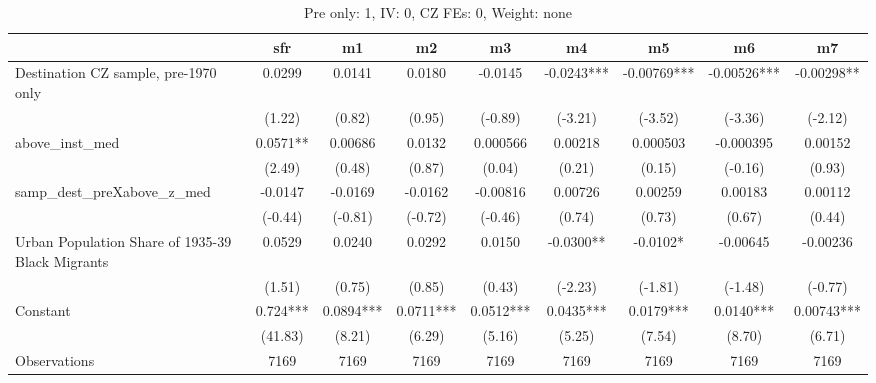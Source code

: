\begin{table}[htbp]\centering
\def\sym#1{\ifmmode^{#1}\else\(^{#1}\)\fi}
\caption{Pre only: 1, IV: 0, CZ FEs: 0, Weight: none}
\begin{tabular}{l*{8}{c}}
\toprule
                    &\multicolumn{1}{c}{sfr}&\multicolumn{1}{c}{m1}&\multicolumn{1}{c}{m2}&\multicolumn{1}{c}{m3}&\multicolumn{1}{c}{m4}&\multicolumn{1}{c}{m5}&\multicolumn{1}{c}{m6}&\multicolumn{1}{c}{m7}\\
\midrule
Destination CZ sample, pre-1970 only&      0.0299   &      0.0141   &      0.0180   &     -0.0145   &     -0.0243***&    -0.00769***&    -0.00526***&    -0.00298** \\
                    &      (1.22)   &      (0.82)   &      (0.95)   &     (-0.89)   &     (-3.21)   &     (-3.52)   &     (-3.36)   &     (-2.12)   \\
\addlinespace
above\_inst\_med      &      0.0571** &     0.00686   &      0.0132   &    0.000566   &     0.00218   &    0.000503   &   -0.000395   &     0.00152   \\
                    &      (2.49)   &      (0.48)   &      (0.87)   &      (0.04)   &      (0.21)   &      (0.15)   &     (-0.16)   &      (0.93)   \\
\addlinespace
samp\_dest\_preXabove\_z\_med&     -0.0147   &     -0.0169   &     -0.0162   &    -0.00816   &     0.00726   &     0.00259   &     0.00183   &     0.00112   \\
                    &     (-0.44)   &     (-0.81)   &     (-0.72)   &     (-0.46)   &      (0.74)   &      (0.73)   &      (0.67)   &      (0.44)   \\
\addlinespace
Urban Population Share of 1935-39 Black Migrants&      0.0529   &      0.0240   &      0.0292   &      0.0150   &     -0.0300** &     -0.0102*  &    -0.00645   &    -0.00236   \\
                    &      (1.51)   &      (0.75)   &      (0.85)   &      (0.43)   &     (-2.23)   &     (-1.81)   &     (-1.48)   &     (-0.77)   \\
\addlinespace
Constant            &       0.724***&      0.0894***&      0.0711***&      0.0512***&      0.0435***&      0.0179***&      0.0140***&     0.00743***\\
                    &     (41.83)   &      (8.21)   &      (6.29)   &      (5.16)   &      (5.25)   &      (7.54)   &      (8.70)   &      (6.71)   \\
\midrule
Observations        &        7169   &        7169   &        7169   &        7169   &        7169   &        7169   &        7169   &        7169   \\

\end{tabular}
\end{table}
